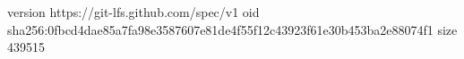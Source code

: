 version https://git-lfs.github.com/spec/v1
oid sha256:0fbcd4dae85a7fa98e3587607e81de4f55f12c43923f61e30b453ba2e88074f1
size 439515

